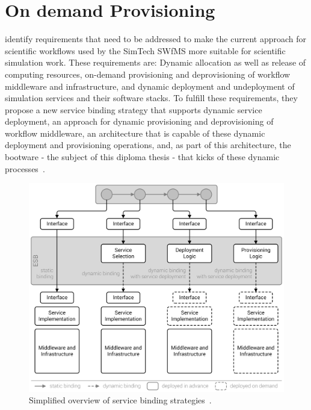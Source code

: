 \section{On demand Provisioning}
\label{related:ondemand}

\citeauthor{provisioning:ondemand} identify requirements that need to be addressed to make the current approach for scientific workflows used by the SimTech SWfMS more suitable for scientific simulation work. These requirements are: Dynamic allocation as well as release of computing resources, on-demand provisioning and deprovisioning of workflow middleware and infrastructure, and dynamic deployment and undeployment of simulation services and their software stacks. To fulfill these requirements, they propose a new service binding strategy that supports dynamic service deployment, an approach for dynamic provisioning and deprovisioning of workflow middleware, an architecture that is capable of these dynamic deployment and provisioning operations, and, as part of this architecture, the bootware - the subject of this diploma thesis - that kicks of these dynamic processes~\autocite{provisioning:ondemand}.

\begin{figure}[!htbp]
	\centering
	\includegraphics[resolution=600]{related/assets/service_binding_strategies}
	\caption{Simplified overview of service binding strategies~\autocite[based on][]{provisioning:ondemand}.}
	\label{image:service_binding_strategies}
\end{figure}

